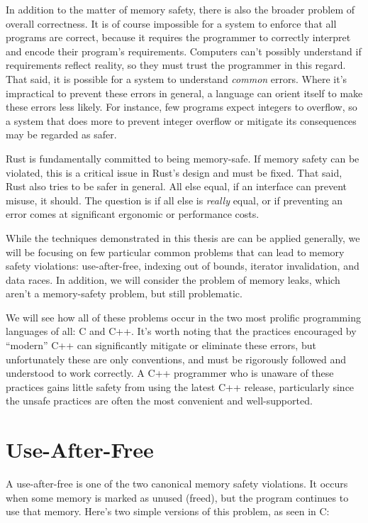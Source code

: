In addition to the matter of memory safety, there is also the broader problem
of overall correctness. It is of course impossible for a system to enforce
that all programs are correct, because it requires the programmer to
correctly interpret and encode their program's requirements. Computers can't
possibly understand if requirements reflect reality, so they must trust the
programmer in this regard. That said, it is possible for a system to understand
\emph{common} errors. Where it's impractical to prevent these errors in general,
a language can orient itself to make these errors less likely. For instance,
few programs expect integers to overflow, so a system that does more to prevent
integer overflow or mitigate its consequences may be regarded as safer.

Rust is fundamentally committed to being memory-safe. If memory safety can
be violated, this is a critical issue in Rust's design and must be fixed. That said,
Rust also tries to be safer in general. All else equal, if an interface can
prevent misuse, it should. The question is if all else is
\emph{really} equal, or if preventing an error comes at significant ergonomic or
performance costs.

While the techniques demonstrated in this thesis are can be applied generally,
we will be focusing on few particular common problems that can lead to
memory safety violations: use-after-free, indexing out of bounds,
iterator invalidation, and data races. In addition, we will consider the problem of
memory leaks, which aren't a memory-safety problem, but still problematic.

We will see how all of these problems occur in the two most prolific programming
languages of all: C and C++. It's worth noting that the practices encouraged
by ``modern'' C++ can significantly mitigate or eliminate these errors, but
unfortunately these are only conventions, and must be rigorously followed
and understood to work correctly. A C++ programmer who is unaware of these
practices gains little safety from using the latest C++ release, particularly
since the unsafe practices are often the most convenient and well-supported.




\section{Use-After-Free}

A use-after-free is one of the two canonical memory safety violations. It
occurs when some memory is marked as unused (freed), but the program
continues to use that memory. Here's two simple versions of this problem, as
seen in C:

